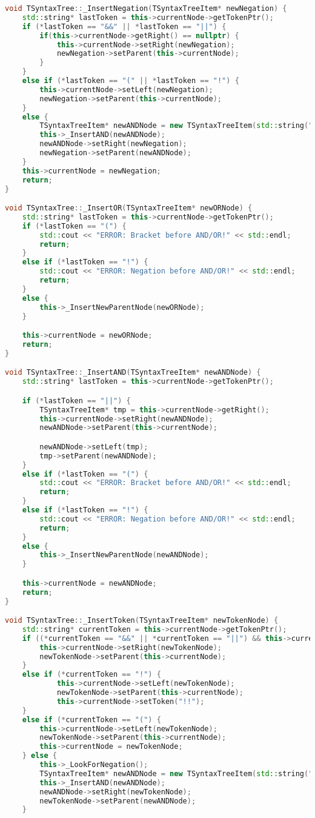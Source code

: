 \begin{lstlisting}[language=C++]
void TSyntaxTree::_InsertNegation(TSyntaxTreeItem* newNegation) {
    std::string* lastToken = this->currentNode->getTokenPtr();
    if (*lastToken == "&&" || *lastToken == "||") {
        if(this->currentNode->getRight() == nullptr) {
            this->currentNode->setRight(newNegation);
            newNegation->setParent(this->currentNode);
        }
    } 
    else if (*lastToken == "(" || *lastToken == "!") {
        this->currentNode->setLeft(newNegation);
        newNegation->setParent(this->currentNode);
    }
    else {
        TSyntaxTreeItem* newANDNode = new TSyntaxTreeItem(std::string("&&"));
        this->_InsertAND(newANDNode);
        newANDNode->setRight(newNegation);
        newNegation->setParent(newANDNode);
    }
    this->currentNode = newNegation;
    return;
}

void TSyntaxTree::_InsertOR(TSyntaxTreeItem* newORNode) {
    std::string* lastToken = this->currentNode->getTokenPtr();
    if (*lastToken == "(") {
        std::cout << "ERROR: Bracket before AND/OR!" << std::endl;
        return;
    }
    else if (*lastToken == "!") {
        std::cout << "ERROR: Negation before AND/OR!" << std::endl;
        return;
    }
    else {
        this->_InsertNewParentNode(newORNode);
    }

    this->currentNode = newORNode;
    return;
}

void TSyntaxTree::_InsertAND(TSyntaxTreeItem* newANDNode) {
    std::string* lastToken = this->currentNode->getTokenPtr();

    if (*lastToken == "||") {
        TSyntaxTreeItem* tmp = this->currentNode->getRight();
        this->currentNode->setRight(newANDNode);
        newANDNode->setParent(this->currentNode);

        newANDNode->setLeft(tmp);
        tmp->setParent(newANDNode);
    }
    else if (*lastToken == "(") {
        std::cout << "ERROR: Bracket before AND/OR!" << std::endl;
        return;
    }
    else if (*lastToken == "!") {
        std::cout << "ERROR: Negation before AND/OR!" << std::endl;
        return;
    }
    else {
        this->_InsertNewParentNode(newANDNode);
    }

    this->currentNode = newANDNode;
    return;
}

void TSyntaxTree::_InsertToken(TSyntaxTreeItem* newTokenNode) {
    std::string* currentToken = this->currentNode->getTokenPtr();
    if ((*currentToken == "&&" || *currentToken == "||") && this->currentNode->getRight() == nullptr) {
        this->currentNode->setRight(newTokenNode);
        newTokenNode->setParent(this->currentNode);
    }
    else if (*currentToken == "!") {
            this->currentNode->setLeft(newTokenNode);
            newTokenNode->setParent(this->currentNode);
            this->currentNode->setToken("!!");
    } 
    else if (*currentToken == "(") {
        this->currentNode->setLeft(newTokenNode);
        newTokenNode->setParent(this->currentNode);
        this->currentNode = newTokenNode;
    } else {
        this->_LookForNegation();
        TSyntaxTreeItem* newANDNode = new TSyntaxTreeItem(std::string("&&"));
        this->_InsertAND(newANDNode);
        newANDNode->setRight(newTokenNode);
        newTokenNode->setParent(newANDNode);
    }


\end{lstlisting}
